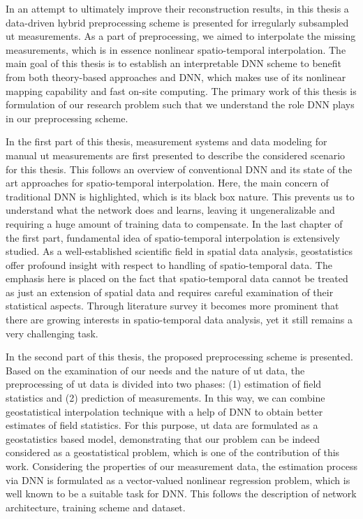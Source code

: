 In an attempt to ultimately improve their reconstruction results, in this thesis a data-driven hybrid preprocessing scheme is presented for irregularly subsampled \acrshort{ut} measurements. As a part of preprocessing, we aimed to interpolate the missing measurements, which is in essence nonlinear spatio-temporal interpolation. The main goal of this thesis is to establish an interpretable \acrshort{DNN} scheme to benefit from both theory-based approaches and \acrshort*{DNN}, which makes use of its nonlinear mapping capability and fast on-site computing. The primary work of this thesis is formulation of our research problem such that we understand the role \acrshort*{DNN} plays in our preprocessing scheme. \par

In the first part of this thesis, measurement systems and data modeling for manual \acrshort{ut} measurements are first presented to describe the considered scenario for this thesis. This follows an overview of conventional \acrshort*{DNN} and its state of the art approaches for spatio-temporal interpolation. Here, the main concern of traditional \acrshort*{DNN} is highlighted, which is its black box nature. This prevents us to understand what the network does and learns, leaving it ungeneralizable and requiring a huge amount of training data to compensate. In the last chapter of the first part, fundamental idea of spatio-temporal interpolation is extensively studied. As a well-established scientific field in spatial data analysis, geostatistics offer profound insight with respect to handling of spatio-temporal data. The emphasis here is placed on the fact that spatio-temporal data cannot be treated as just an extension of spatial data and requires careful examination of their statistical aspects. Through literature survey it becomes more prominent that there are growing interests in spatio-temporal data analysis, yet it still remains a very challenging task. \par

In the second part of this thesis, the proposed preprocessing scheme is presented. Based on the examination of our needs and the nature of \acrshort*{ut} data,  the preprocessing of \acrshort*{ut} data is divided into two phases: (1) estimation of field statistics and (2) prediction of measurements. In this way, we can combine geostatistical interpolation technique with a help of \acrshort*{DNN} to obtain better estimates of field statistics. For this purpose, \acrshort*{ut} data are formulated as a geostatistics based model, demonstrating that our problem can be indeed considered as a geostatistical problem, which is one of the contribution of this work. Considering the properties of our measurement data, the estimation process via \acrshort*{DNN} is formulated as a vector-valued nonlinear regression problem, which is well known to be a suitable task for \acrshort*{DNN}. This follows the description of network architecture, training scheme and dataset. \par


